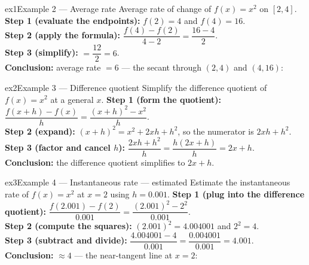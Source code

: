 \documentclass[11pt]{article}
\begin{document}
\begin{example}{ex1}{Example 2 --- Average rate}
Average rate of change of $f(x)=x^2$ on $[2,4]$.\soln
\textbf{Step 1 (evaluate the endpoints):} $f(2)=4$ and $f(4)=16$.\\[3pt]
\textbf{Step 2 (apply the formula):} $\dfrac{f(4)-f(2)}{4-2}=\dfrac{16-4}{2}$.\\[3pt]
\textbf{Step 3 (simplify):} $=\dfrac{12}{2}=6$.\\[3pt]
\textbf{Conclusion:} average rate $=6$ --- the secant through $(2,4)$ and $(4,16)$:
\end{example}

\begin{example}{ex2}{Example 3 --- Difference quotient}
Simplify the difference quotient of $f(x)=x^2$ at a general $x$.\soln
\textbf{Step 1 (form the quotient):} $\dfrac{f(x+h)-f(x)}{h}=\dfrac{(x+h)^2-x^2}{h}$.\\[3pt]
\textbf{Step 2 (expand):} $(x+h)^2=x^2+2xh+h^2$, so the numerator is $2xh+h^2$.\\[3pt]
\textbf{Step 3 (factor and cancel $h$):} $\dfrac{2xh+h^2}{h}=\dfrac{h(2x+h)}{h}=2x+h$.\\[3pt]
\textbf{Conclusion:} the difference quotient simplifies to $2x+h$.
\end{example}

\begin{example}{ex3}{Example 4 --- Instantaneous rate --- estimated}
Estimate the instantaneous rate of $f(x)=x^2$ at $x=2$ using $h=0.001$.\soln
\textbf{Step 1 (plug into the difference quotient):} $\dfrac{f(2.001)-f(2)}{0.001}=\dfrac{(2.001)^2-2^2}{0.001}$.\\[3pt]
\textbf{Step 2 (compute the squares):} $(2.001)^2=4.004001$ and $2^2=4$.\\[3pt]
\textbf{Step 3 (subtract and divide):} $\dfrac{4.004001-4}{0.001}=\dfrac{0.004001}{0.001}=4.001$.\\[3pt]
\textbf{Conclusion:} $\approx4$ --- the near-tangent line at $x=2$:
\end{example}
\end{document}
